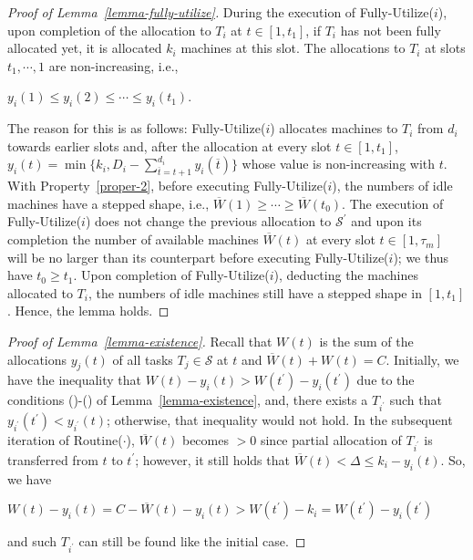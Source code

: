 \documentclass[10pt,journal,compsoc]{IEEEtran}
\newcommand{\rmnum}[1]{\romannumeral #1}
\begin{document}
\begin{proof}[Proof of Lemma~\ref{lemma-fully-utilize}]
During the execution of Fully-Utilize($i$), upon completion of the allocation to $T_{i}$ at $t\in [1, t_{1}]$, if $T_{i}$ has not been fully allocated yet, it is allocated $k_{i}$ machines at this slot.
The allocations to $T_{i}$ at slots $t_{1}, \cdots, 1$ are non-increasing, i.e.,
\begin{center}
$y_{i}(1)\leq y_{i}(2)\leq \cdots\leq y_{i}(t_{1})$.
\end{center}
The reason for this is as follows: Fully-Utilize($i$) allocates machines to $T_{i}$ from $d_{i}$ towards earlier slots and, after the allocation at every slot $t\in [1, t_{1}]$, $y_{i}(t)=\min\{k_{i}, D_{i}-\sum_{\overline{t}=t+1}^{d_{i}}{y_{i}(\overline{t})}\}$ whose value is non-increasing with $t$. With Property~\ref{proper-2}, before executing Fully-Utilize($i$), the numbers of idle machines have a stepped shape, i.e., $\overline{W}(1)\geq \cdots\geq \overline{W}(t_{0})$. The execution of Fully-Utilize($i$) does not change the previous allocation to $\mathcal{S}^{\prime}$ and upon its completion the number of available machines $\overline{W}(t)$ at every slot $t\in [1, \tau_{m}]$ will be no larger than its counterpart before executing Fully-Utilize($i$); we thus have $t_{0}\geq t_{1}$. Upon completion of Fully-Utilize($i$), deducting the machines allocated to $T_{i}$, the numbers of idle machines still have a stepped shape in $[1, t_{1}]$. Hence, the lemma holds.
\end{proof}




\begin{proof}[Proof of Lemma~\ref{lemma-existence}]
Recall that $W(t)$ is the sum of the allocations $y_{j}(t)$ of all tasks $T_{j}\in \mathcal{S}$ at $t$ and $\overline{W}(t) + W(t)=C$. Initially, we have the inequality that $W(t)-y_{i}(t)>W(t^{\prime})-y_{i}(t^{\prime})$ due to the conditions (\rmnum{1})-(\rmnum{3}) of Lemma~\ref{lemma-existence}, and, there exists a $T_{i^{\prime}}$ such that $y_{i^{\prime}}(t^{\prime})<y_{i^{\prime}}(t)$; otherwise, that inequality would not hold. In the subsequent iteration of Routine($\cdot$), $\overline{W}(t)$ becomes $>0$ since partial allocation of $T_{i^{\prime}}$ is transferred from $t$ to $t^{\prime}$; however, it still holds that $\overline{W}(t)<\Delta\leq k_{i}-y_{i}(t)$. So, we have
\begin{center}
$W(t)-y_{i}(t) = C-\overline{W}(t)-y_{i}(t) > W(t^{\prime})-k_{i} = W(t^{\prime})-y_{i}(t^{\prime})$
\end{center}
and such $T_{i^{\prime}}$ can still be found like the initial case.
\end{proof}
\end{document}
